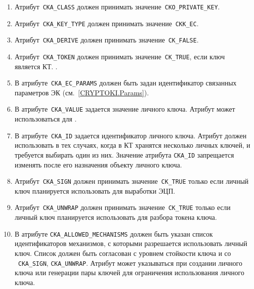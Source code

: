 \begin{enumerate}
\item
Атрибут~\verb|CKA_CLASS| должен принимать значение~\verb|CKO_PRIVATE_KEY|.

\item
Атрибут~\verb|CKA_KEY_TYPE| должен принимать значение~\verb|CKK_EC|.

\item
Атрибут~\verb|CKA_DERIVE| должен принимать значение~\verb|CK_FALSE|.

\item
Атрибут~\verb|CKA_TOKEN| должен принимать значение~\verb|CK_TRUE|,
если ключ является  КТ. 
%
.

\item
В атрибуте~\verb|CKA_EC_PARAMS| должен быть задан идентификатор связанных
параметров ЭК (см.~\ref{CRYPTOKI.Params}).

\item
В атрибуте~\verb|CKA_VALUE| задается значение личного ключа.
Атрибут может использоваться для .

\item
В атрибуте~\verb|CKA_ID| задается идентификатор личного ключа.
Атрибут должен использовать в тех случаях, когда в КТ
хранятся несколько личных ключей, и требуется выбирать один из них. 
%
Значение атрибута \verb|CKA_ID| запрещается изменять
после его назначения объекту личного ключа.

\item
Атрибут~\verb|CKA_SIGN| должен принимать значение~\verb|CK_TRUE|
только если личный ключ планируется использовать для выработки ЭЦП.

\item
Атрибут~\verb|CKA_UNWRAP| должен принимать значение~\verb|CK_TRUE|
только если личный ключ планируется использовать для разбора
токена ключа.

\item
В атрибуте \verb|CKA_ALLOWED_MECHANISMS| должен быть указан список 
идентификаторов механизмов, с которыми разрешается использовать личный 
ключ. Список должен быть согласован с уровнем стойкости ключа и со 
~\verb|CKA_SIGN|, \verb|CKA_UNWRAP|. 
%
Атрибут может указываться при создании  личного ключа 
или генерации пары ключей для ограничения использования личного ключа. 


\end{enumerate}
